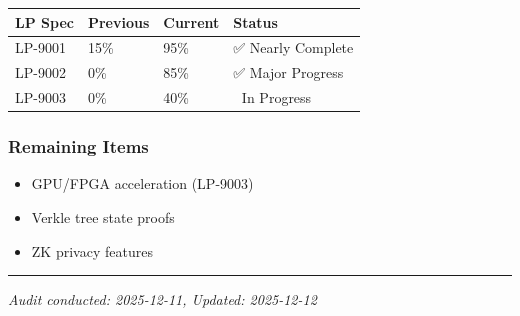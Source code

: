 \documentclass[
]{article}
\newcounter{none} %
\providecommand{\tightlist}{%
  \setlength{\itemsep}{0pt}\setlength{\parskip}{0pt}}
\begin{document}
{\def\LTcaptype{none} %
\begin{longtable}[]{@{}llll@{}}
\toprule\noalign{}
LP Spec & Previous & Current & Status \\
\midrule\noalign{}
\endhead
\bottomrule\noalign{}
\endlastfoot
LP-9001 & 15\% & 95\% & ✅ Nearly Complete \\
LP-9002 & 0\% & 85\% & ✅ Major Progress \\
LP-9003 & 0\% & 40\% & 🔄 In Progress \\
\end{longtable}
}

\subsubsection{Remaining Items}\label{remaining-items}

\begin{itemize}
\tightlist
\item
  GPU/FPGA acceleration (LP-9003)
\item
  Verkle tree state proofs
\item
  ZK privacy features
\end{itemize}

\begin{center}\rule{0.5\linewidth}{0.5pt}\end{center}

\emph{Audit conducted: 2025-12-11, Updated: 2025-12-12}
\end{document}

